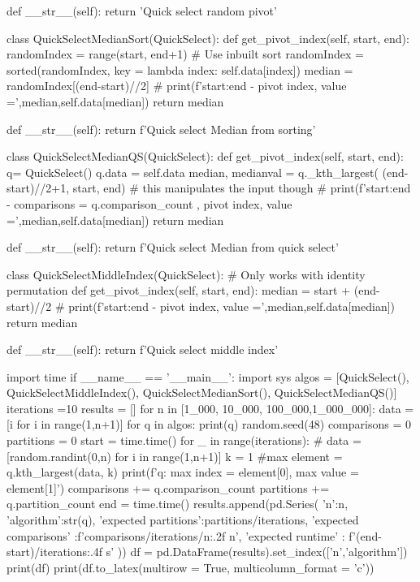 \documentclass{homeworg}
\begin{document}
\begin{python}
    def __str__(self):
        return 'Quick select random pivot'

class QuickSelectMedianSort(QuickSelect):
    def get_pivot_index(self, start, end):
        randomIndex = range(start, end+1)
        # Use inbuilt sort
        randomIndex = sorted(randomIndex, key = lambda index: self.data[index])
        median = randomIndex[(end-start)//2]
        # print(f'{start}:{end} - pivot index, value =',median,self.data[median])
        return median

    def __str__(self):
        return f'Quick select Median from sorting'

class QuickSelectMedianQS(QuickSelect):
    def get_pivot_index(self, start, end):
        q= QuickSelect()
        q.data = self.data
        median, medianval = q._kth_largest( (end-start)//2+1, start, end) # this manipulates the input though
        # print(f'{start}:{end} - comparisons = {q.comparison_count} , pivot index, value =',median,self.data[median])
        return median

    def __str__(self):
        return f'Quick select Median from quick select'

class QuickSelectMiddleIndex(QuickSelect):
    # Only works with identity permutation
    def get_pivot_index(self, start, end):
        median = start + (end-start)//2
        # print(f'{start}:{end} - pivot index, value =',median,self.data[median])
        return median

    def __str__(self):
        return f'Quick select middle index'

import time
if __name__ == '__main__':
    import sys
    algos = [QuickSelect(), QuickSelectMiddleIndex(), QuickSelectMedianSort(), QuickSelectMedianQS()]
    iterations  =10
    results = []
    for n in [1_000, 10_000, 100_000,1_000_000]:
        data = [i for i in range(1,n+1)]
        for q in algos:
            print(q)
            random.seed(48)
            comparisons = 0
            partitions = 0
            start = time.time()
            for _ in range(iterations):
                # data = [random.randint(0,n) for i in range(1,n+1)]
                k = 1 #max
                element = q.kth_largest(data, k)
                print(f'q: max index =  {element[0]}, max value = {element[1]}')
                comparisons += q.comparison_count
                partitions += q.partition_count
            end = time.time()
            results.append(pd.Series({
                'n':n,
                'algorithm':str(q),
                'expected partitions':partitions/iterations,
                'expected comparisons' :f'{comparisons/iterations/n:.2f} n',
                'expected runtime' : f'{(end-start)/iterations:.4f} s'
            }))
    df = pd.DataFrame(results).set_index(['n','algorithm'])
    print(df)
    print(df.to_latex(multirow = True, multicolumn_format = 'c'))

\end{python}
\end{document}
